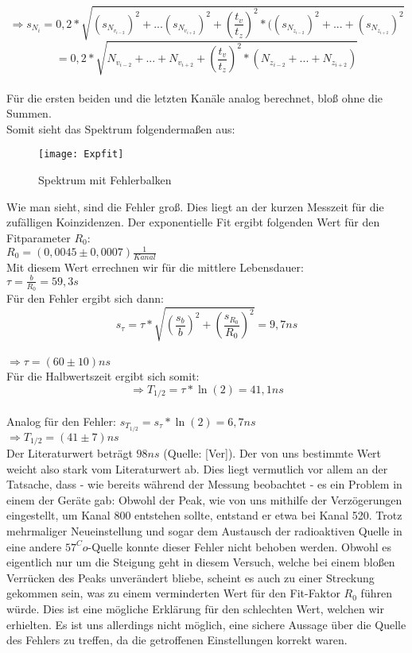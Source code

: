 \[\Rightarrow s_{N_{i}}=0,2*\sqrt{(s_{N_{v_{i-2}}})^{2}+...(s_{N_{v_{i+2}}})^{2}+(\frac{t_{v}}{t_{z}})^{2}*((s_{N_{z_{i-2}}})^{2}+...+(s_{N_{z_{i+2}}})^{2}}\]
\[=0,2*\sqrt{N_{v_{i-2}}+...+N_{v_{i+2}}+(\frac{t_{v}}{t_{z}})^{2}*(N_{z_{i-2}}+...+N_{z_{i+2}})}\]\\
Für die ersten beiden und die letzten Kanäle analog berechnet, bloß ohne die Summen.\\
Somit sieht das Spektrum folgendermaßen aus:
\clearpage
\begin{figure}[h]
\texttt{[image: Expfit]}
\caption{Spektrum mit Fehlerbalken}
\end{figure}
Wie man sieht, sind die Fehler groß. Dies liegt an der kurzen Messzeit für die zufälligen Koinzidenzen. Der exponentielle Fit ergibt folgenden Wert für den Fitparameter $R_{0}$:\\
$R_{0}=(0,0045\pm 0,0007)\frac{1}{Kanal}$\\
Mit diesem Wert errechnen wir für die mittlere Lebensdauer:\\
$\tau=\frac{b}{R_{0}}=59,3s$\\
Für den Fehler ergibt sich dann: \\
\[s_{\tau}=\tau*\sqrt{\left(\frac{s_{b}}{b}\right)^{2}+\left(\frac{s_{R_{0}}}{R_{0}}\right)^{2}}=9,7ns\]\\
$\Rightarrow \tau=(60\pm10)ns$\\
Für die Halbwertszeit ergibt sich somit:\\
\[\Rightarrow T_{1/2}=\tau*\ln(2)=41,1 ns\]\\
Analog für den Fehler: $s_{T_{1/2}}=s_{\tau}*\ln(2)=6,7 ns$\\
$\Rightarrow T_{1/2}=(41\pm7)ns$\\
Der Literaturwert beträgt $98 ns$ (Quelle: [Ver]). Der von uns bestimmte Wert weicht also stark vom Literaturwert ab. Dies liegt vermutlich vor allem an der Tatsache, dass - wie bereits während der Messung beobachtet - es ein Problem in einem der Geräte gab: Obwohl der Peak, wie von uns mithilfe der Verzögerungen eingestellt, um Kanal 800 entstehen sollte, entstand er etwa bei Kanal 520. Trotz mehrmaliger Neueinstellung und sogar dem Austausch der radioaktiven Quelle in eine andere ${57}^Co$-Quelle konnte dieser Fehler nicht behoben werden. Obwohl es eigentlich nur um die Steigung geht in diesem Versuch, welche bei einem bloßen Verrücken des Peaks unverändert bliebe, scheint es auch zu einer Streckung gekommen sein, was zu einem verminderten Wert für den Fit-Faktor $R_{0}$ führen würde. Dies ist eine mögliche Erklärung für den schlechten Wert, welchen wir erhielten. Es ist uns allerdings nicht möglich, eine sichere Aussage über die Quelle des Fehlers zu treffen, da die getroffenen Einstellungen korrekt waren.\\
